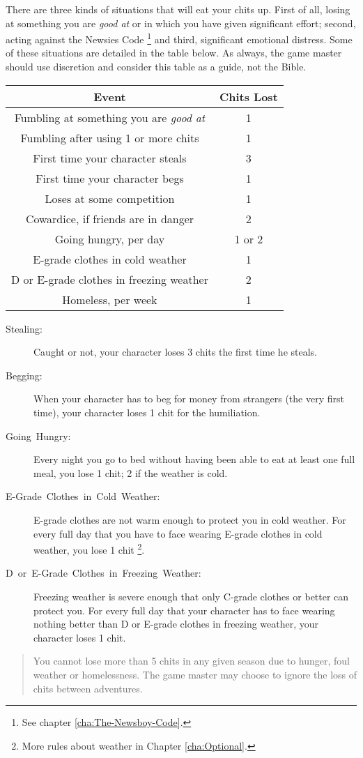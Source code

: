 There are three kinds of situations that will eat your chits up. First
of all, losing at something you are \emph{good at} or in which you
have given significant effort; second, acting against the Newsies
Code%
\footnote{See chapter \vref{cha:The-Newsboy-Code}.%
} and third, significant emotional distress. Some of these situations
are detailed in the table below. As always, the game master should
use discretion and consider this table as a guide, not the Bible.

\noindent \begin{center}
\begin{tabular}{cc}
\toprule 
Event & Chits Lost\tabularnewline
\midrule
\midrule 
Fumbling at something you are \emph{good at} & 1\tabularnewline
\midrule 
Fumbling after using 1 or more chits & 1\tabularnewline
\midrule 
First time your character steals & 3\tabularnewline
\midrule 
First time your character begs & 1\tabularnewline
\midrule 
Loses at some competition & 1\tabularnewline
\midrule 
Cowardice, if friends are in danger & 2\tabularnewline
\midrule 
Going hungry, per day & 1 or 2\tabularnewline
\midrule 
E-grade clothes in cold weather & 1\tabularnewline
\midrule 
D or E-grade clothes in freezing weather & 2\tabularnewline
\midrule 
Homeless, per week & 1\tabularnewline
\bottomrule
\end{tabular}
\par\end{center}
\begin{description}
\item [{Stealing:}] Caught or not, your character loses 3 chits the first
time he steals.
\item [{Begging:}] When your character has to beg for money from strangers
(the very first time), your character loses 1 chit for the humiliation.
\item [{Going~Hungry:}] Every night you go to bed without having been
able to eat at least one full meal, you lose 1 chit; 2 if the weather
is cold.
\item [{E-Grade~Clothes~in~Cold~Weather:}] E-grade clothes are not
warm enough to protect you in cold weather. For every full day that
you have to face wearing E-grade clothes in cold weather, you lose
1 chit%
\footnote{More rules about weather in Chapter \vref{cha:Optional}.%
}.
\item [{D~or~E-Grade~Clothes~in~Freezing~Weather:}] Freezing weather
is severe enough that only C-grade clothes or better can protect you.
For every full day that your character has to face wearing nothing
better than D or E-grade clothes in freezing weather, your character
loses 1 chit.\end{description}
\begin{quote}
You cannot lose more than 5 chits in any given season due to hunger,
foul weather or homelessness. The game master may choose to ignore
the loss of chits between adventures.
\end{quote}

